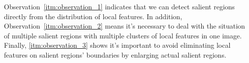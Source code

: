 Observation~\ref{itm:observation_1} indicates that we can detect salient regions directly from the distribution of local features. In addition, Observation~\ref{itm:observation_2} means it's necessary to deal with the situation of multiple salient regions with multiple clusters of local features in one image. Finally, \ref{itm:observation_3} shows it's important to avoid eliminating local features on salient regions' boundaries by enlarging actual salient regions.
